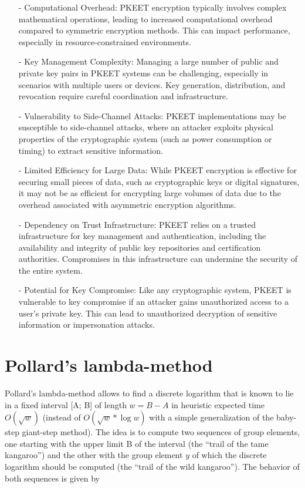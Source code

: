 \documentclass[12pt]{article}
\begin{document}
\begin{itemize}
    \item[-]Computational Overhead: PKEET encryption typically involves complex mathematical operations, leading to increased computational overhead compared to symmetric encryption methods. This can impact performance, especially in resource-constrained environments.
    \item[-]Key Management Complexity: Managing a large number of public and private key pairs in PKEET systems can be challenging, especially in scenarios with multiple users or devices. Key generation, distribution, and revocation require careful coordination and infrastructure.
    \item[-]Vulnerability to Side-Channel Attacks: PKEET implementations may be susceptible to side-channel attacks, where an attacker exploits physical properties of the cryptographic system (such as power consumption or timing) to extract sensitive information.
    \item[-]Limited Efficiency for Large Data: While PKEET encryption is effective for securing small pieces of data, such as cryptographic keys or digital signatures, it may not be as efficient for encrypting large volumes of data due to the overhead associated with asymmetric encryption algorithms.
    \item[-]Dependency on Trust Infrastructure: PKEET relies on a trusted infrastructure for key management and authentication, including the availability and integrity of public key repositories and certification authorities. Compromises in this infrastructure can undermine the security of the entire system.
    \item[-]Potential for Key Compromise: Like any cryptographic system, PKEET is vulnerable to key compromise if an attacker gains unauthorized access to a user's private key. This can lead to unauthorized decryption of sensitive information or impersonation attacks.
\end{itemize}
\section{Pollard’s lambda-method}
Pollard’s lambda-method allows to find a discrete logarithm that is known to lie in a fixed interval [A; B] of length  $w=B-A$ in heuristic expected time $O(\sqrt{w})$ (instead of $O(\sqrt{w}*\log{w})$ with a simple generalization of the baby-step giant-step method). The idea is to compute two sequences of group elements, one starting with the upper limit B of the interval (the “trail of the tame kangaroo”) and the other with the group element $y$ of which the discrete logarithm should be computed (the “trail of the wild kangaroo”). The behavior of both sequences is given by
\end{document}
